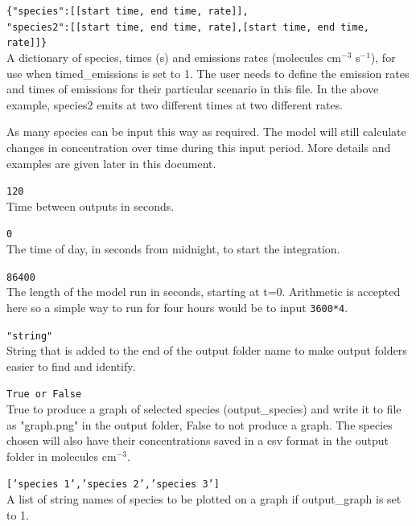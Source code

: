 \documentclass[a4paper]{refart}
\begin{document}
\texttt{\{"species":[[start time, end time, rate]],\\
          "species2":[[start time, end time, rate],[start time, end time, rate]]\}}\\
A dictionary of species, times (s) and emissions rates  (molecules cm$^{-3}$ s$^{-1}$), for use when timed\_emissions is set to 1. The user needs to define the emission rates and times of emissions for their particular scenario in this file. In the above example, species2 emits at two different times at two different rates.

 As many species can be input this way as required. The model will still calculate changes in concentration over time during this input period. More details and examples are given later in this document.

\texttt{120}\\
Time between outputs in seconds. 

\texttt{0}\\
The time of day, in seconds from midnight, to start the integration. 

\texttt{86400}\\
The length of the model run in seconds, starting at t=0. Arithmetic is accepted here so a simple way to run for four hours would be to input \texttt{3600*4}.

\texttt{"string"}\\
String that is added to the end of the output folder name to make output folders easier to find and identify. 

\texttt{True or False}\\
True to produce a graph of selected species (output\_species) and write it to file as "graph.png" in the output folder, False to not produce a graph. The species chosen will also have their concentrations saved in a csv format in the output folder in molecules cm$^{-3}$.

\texttt{['species 1','species 2','species 3']}\\
A list of string names of species to be plotted on a graph if output\_graph is set to 1.
\end{document}
